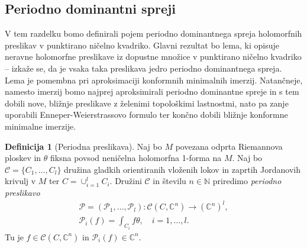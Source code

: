 \documentclass[12pt,a4paper,twoside]{article}
\theoremstyle{definition} %
\newtheorem{definicija}{Definicija}[section]
\theoremstyle{plain} %
\numberwithin{equation}{section}  %
\newcommand{\N}{\mathbb N}
\newcommand{\C}{\mathbb C}
\begin{document}
\subsection{Periodno dominantni spreji}
%
V tem razdelku bomo definirali pojem periodno dominantnega spreja holomorfnih preslikav v punktirano ničelno kvadriko. Glavni rezultat bo lema, ki opisuje neravne holomorfne preslikave iz dopustne množice v punktirano ničelno kvadriko -- izkaže se, da je vsaka taka preslikava jedro periodno dominantnega spreja. Lema je pomembna pri aproksimaciji konformnih minimalnih imerzij. Natančneje, namesto imerzij bomo najprej aproksimirali periodno dominantne spreje in s tem dobili nove, bližnje preslikave z želenimi topološkimi lastnostmi, nato pa zanje uporabili Enneper-Weierstrassovo formulo ter končno dobili bližnje konformne minimalne imerzije.

\begin{definicija} [Periodna preslikava]
Naj bo $M$ povezana odprta Riemannova ploskev in $\theta$ fiksna povsod neničelna holomorfna 1-forma na $M$. Naj bo $\mathcal{C} = \{C_1, \dots , C_{l} \}$ družina gladkih orientiranih vloženih lokov in zaprtih Jordanovih krivulj v $M$ ter $C = \cup_{i=1}^{l} C_{i}$.
Družini $\mathcal{C}$ in številu $n \in \N$ priredimo \emph{periodno preslikavo}
\begin{gather}
\mathcal{P} = (\mathcal{P}_1, \dots , \mathcal{P}_{l}) \colon \mathcal{C}(C, \C^{n}) \to (\C^{n})^{l}, \nonumber \\
\mathcal{P}_{i}(f) = \int_{C_{i}} f \theta, \quad i=1, \dots , l.
\end{gather}
Tu je $f \in \mathcal{C}(C, \C^{n})$ in $\mathcal{P}_{i}(f) \in \C^{n}$.
\end{definicija}
\end{document}
